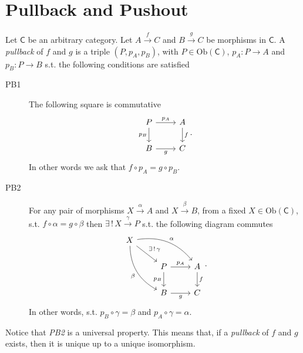 \section{Pullback and Pushout}
\begin{defn}[Pullback]
	Let $\mathsf{C}$ be an arbitrary category.
	Let $A \xrightarrow{f} C$ and $B \xrightarrow{g} C$ be morphisms in $\mathsf{C}$.
	A {\em pullback} of $f$ and $g$ is a triple $\left(P, p_A, p_B\right)$, with $P \in \mathrm{Ob} \left(\mathsf{C}\right)$, $p_A: P \to A$ and $p_B: P \to B$ s.t. the following conditions are satisfied
	\begin{description}
		\item[PB1] The following square is commutative
			\begin{equation}
			\begin{tikzcd}
				P \arrow[r, "p_A", rightarrow] \arrow[d, "p_B"', rightarrow] & A \arrow[d, "f", rightarrow] \\
				B \arrow[r, "g"', rightarrow] & C
			\end{tikzcd}
			.\end{equation} 
			In other words we ask that $f \circ p_A = g \circ p_B$.
		\item[PB2] For any pair of morphisms $X \xrightarrow{\alpha} A$ and $X \xrightarrow{\beta} B$, from a fixed $X \in \mathrm{Ob} \left(\mathsf{C}\right)$, s.t. $f \circ \alpha = g \circ \beta$ then $\exists\, !\, X \xrightarrow{\gamma} P$ s.t. the following diagram commutes
			\begin{equation}
			\begin{tikzcd}
				X \arrow[rd, "\exists\, !\, \gamma", rightarrow] \arrow[rrd, "\alpha", rightarrow, bend left] \arrow[rdd, "\beta"', rightarrow, bend right] &  & \\
			   & P \arrow[r, "p_A", rightarrow] \arrow[d, "p_B"', rightarrow] & A \arrow[d, "f", rightarrow] \\
			   & B \arrow[r, "g"', rightarrow] & C
			\end{tikzcd}
			.\end{equation} 
			In other words, s.t. $p_B \circ \gamma = \beta$ and $p_A \circ \gamma = \alpha$.
	\end{description} 
\end{defn}
		
\begin{rem}
	Notice that {\em PB2} is a universal property.
	This means that, if a {\em pullback} of $f$ and $g$ exists, then it is unique up to a unique isomorphism.
\end{rem}

